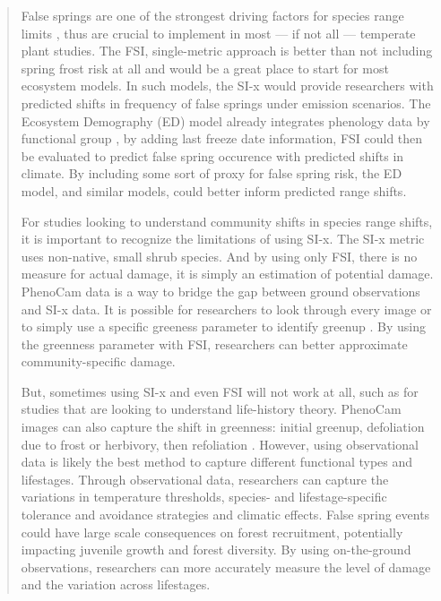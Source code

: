 \documentclass[11pt,a4paper]{article}
\begin{document}
\begin{quotation}
False springs are one of the strongest driving factors for species range limits \citep{Sakai1987}, thus are crucial to implement in most --- if not all --- temperate plant studies. The FSI, single-metric approach is better than not including spring frost risk at all and would be a great place to start for most ecosystem models. In such models, the SI-x would provide researchers with predicted shifts in frequency of false springs under emission scenarios. The Ecosystem Demography (ED) model already integrates phenology data by functional group \citep{Kim2015, Moorcroft2001}, by adding last freeze date information, FSI could then be evaluated to predict false spring occurence with predicted shifts in climate. By including some sort of proxy for false spring risk, the ED model, and similar models, could better inform predicted range shifts. 


For studies looking to understand community shifts in species range shifts, it is important to recognize the limitations of using SI-x. The SI-x metric uses non-native, small shrub species. And by using only FSI, there is no measure for actual damage, it is simply an estimation of potential damage. PhenoCam data is a way to bridge the gap between ground observations and SI-x data. It is possible for researchers to look through every image or to simply use a specific greeness parameter to identify greenup \citep{Richardson2018}. By using the greenness parameter with FSI, researchers can better approximate community-specific damage. 

But, sometimes using SI-x and even FSI will not work at all, such as for studies that are looking to understand life-history theory. PhenoCam images can also capture the shift in greenness: initial greenup, defoliation due to frost or herbivory, then refoliation \citep{Richardson2018b}. However, using observational data is likely the best method to capture different functional types and lifestages. Through observational data, researchers can capture the variations in temperature thresholds, species- and lifestage-specific tolerance and avoidance strategies and climatic effects. False spring events could have large scale consequences on forest recruitment, potentially impacting juvenile growth and forest diversity. By using on-the-ground observations, researchers can more accurately measure the level of damage and the variation across lifestages.
\end{quotation} 
\end{document}
